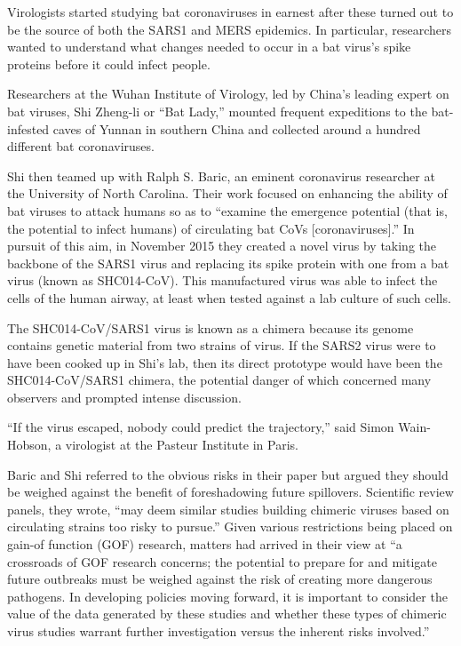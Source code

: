 \documentclass[
]{book}
\begin{document}
Virologists started studying bat coronaviruses in earnest after these turned out to be the source of both the SARS1 and MERS epidemics. In particular, researchers wanted to understand what changes needed to occur in a bat virus's spike proteins before it could infect people.

Researchers at the Wuhan Institute of Virology, led by China's leading expert on bat viruses, Shi Zheng-li or ``Bat Lady,'' mounted frequent expeditions to the bat-infested caves of Yunnan in southern China and collected around a hundred different bat coronaviruses.

Shi then teamed up with Ralph S. Baric, an eminent coronavirus researcher at the University of North Carolina. Their work focused on enhancing the ability of bat viruses to attack humans so as to ``examine the emergence potential (that is, the potential to infect humans) of circulating bat CoVs {[}coronaviruses{]}.'' In pursuit of this aim, in November 2015 they created a novel virus by taking the backbone of the SARS1 virus and replacing its spike protein with one from a bat virus (known as SHC014-CoV). This manufactured virus was able to infect the cells of the human airway, at least when tested against a lab culture of such cells.

The SHC014-CoV/SARS1 virus is known as a chimera because its genome contains genetic material from two strains of virus. If the SARS2 virus were to have been cooked up in Shi's lab, then its direct prototype would have been the SHC014-CoV/SARS1 chimera, the potential danger of which concerned many observers and prompted intense discussion.

``If the virus escaped, nobody could predict the trajectory,'' said Simon Wain-Hobson, a virologist at the Pasteur Institute in Paris.

Baric and Shi referred to the obvious risks in their paper but argued they should be weighed against the benefit of foreshadowing future spillovers. Scientific review panels, they wrote, ``may deem similar studies building chimeric viruses based on circulating strains too risky to pursue.'' Given various restrictions being placed on gain-of function (GOF) research, matters had arrived in their view at ``a crossroads of GOF research concerns; the potential to prepare for and mitigate future outbreaks must be weighed against the risk of creating more dangerous pathogens. In developing policies moving forward, it is important to consider the value of the data generated by these studies and whether these types of chimeric virus studies warrant further investigation versus the inherent risks involved.''
\end{document}
